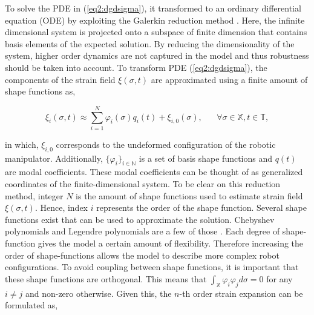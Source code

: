 To solve the PDE in (\ref{eq2:dgdsigma}), it transformed to an ordinary differential equation (ODE) by exploiting the Galerkin reduction method \cite{Galerkin}. Here, the infinite dimensional system is projected onto a subspace of finite dimension that contains basis elements of the expected solution. By reducing the dimensionality of the system, higher order dynamics are not captured in the model and thus robustness should be taken into account. To transform PDE (\ref{eq2:dgdsigma}), the components of the strain field $\xi(\sigma,t)$ are approximated using a finite amount of shape functions as,

\begin{equation}
    \xi_i(\sigma,t) \approx \sum_{i=1}^N \varphi_i(\sigma)q_i(t) + \xi_{i,0}(\sigma), \hspace{20pt} \forall \sigma \in \mathbb{X}, t \in \mathbb{T},
\end{equation}

in which, $\xi_{i,0}$ corresponds to the undeformed configuration of the robotic manipulator. Additionally, $\{\varphi_i\}_{i \in \mathbb{N}}$ is a set of basis shape functions and $q(t)$ are modal coefficients. These modal coefficients can be thought of as generalized coordinates of the finite-dimensional system. To be clear on this reduction method, integer $N$ is the amount of shape functions used to estimate strain field $\xi(\sigma,t)$. Hence, index $i$ represents the order of the shape function. Several shape functions exist that can be used to approximate the solution. Chebyshev polynomials and Legendre polynomials are a few of those \cite{Galerkin}. Each degree of shape-function gives the model a certain amount of flexibility. Therefore increasing the order of shape-functions allows the model to describe more complex robot configurations. To avoid coupling between shape functions,  it is important that these shape functions are orthogonal. This means that $\int_\mathbb{X} \varphi_i \varphi_j d \sigma = 0$ for any $i \neq j$ and non-zero otherwise. Given this, the $n$-th order strain expansion can be formulated as,


